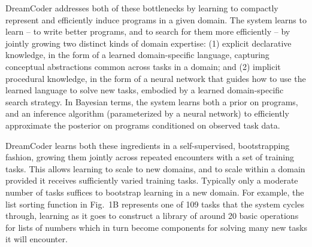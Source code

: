 \documentclass[12pt]{article}
\begin{document}
DreamCoder addresses both of these bottlenecks by learning %
to compactly represent and efficiently induce programs in a given domain.
The system learns to learn -- to write better programs, and to search for them more efficiently -- by jointly growing two distinct kinds of domain expertise: (1) explicit declarative knowledge, in the form of a learned domain-specific language, capturing conceptual abstractions common across tasks in a domain; and (2) implicit procedural knowledge, in the form of a neural network that guides how to use the learned language to solve new tasks, embodied by a learned domain-specific search strategy. In Bayesian terms, the system learns both a prior on programs, and an inference algorithm (parameterized by a neural network) to efficiently approximate the posterior on programs conditioned on observed task data.


DreamCoder learns both these ingredients %
in a self-supervised, bootstrapping fashion, growing them jointly across repeated encounters with a set of training tasks. %
This allows learning to scale to %
new domains, and to scale within a domain provided it receives sufficiently varied training tasks. Typically only a moderate number of tasks suffices to bootstrap learning in a new domain. For example, the list sorting function in Fig.~1B represents one of 109 tasks that the system cycles through, learning as it goes to construct a library of around 20 basic operations for lists of numbers which in turn become components for solving many new tasks it will encounter.
\end{document}
